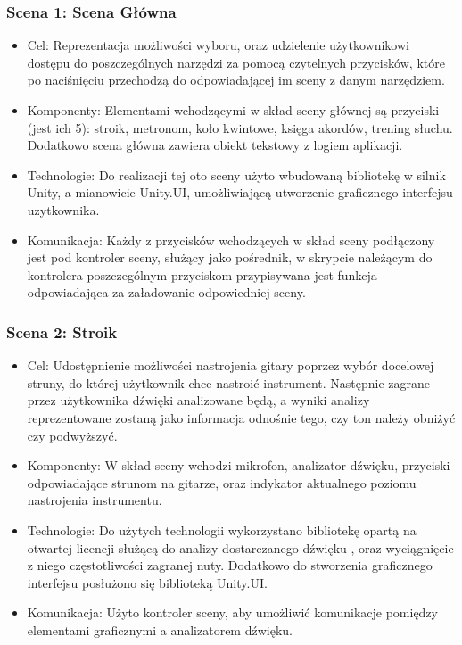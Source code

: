 \subsubsection{Scena 1: Scena Główna}

\begin{itemize}

\item Cel: Reprezentacja możliwości wyboru, oraz udzielenie użytkownikowi dostępu do poszczególnych narzędzi za pomocą czytelnych przycisków, które po naciśnięciu przechodzą do odpowiadającej im sceny z danym narzędziem. 
\item Komponenty: Elementami wchodzącymi w skład sceny głównej są przyciski (jest ich 5): stroik, metronom, koło kwintowe, księga akordów, trening słuchu. Dodatkowo scena główna zawiera obiekt tekstowy z logiem aplikacji.  
\item Technologie: Do realizacji tej oto sceny użyto wbudowaną bibliotekę w silnik Unity, a mianowicie Unity.UI, umożliwiającą utworzenie graficznego interfejsu uzytkownika. 
\item Komunikacja: Każdy z przycisków wchodzących w skład sceny podłączony jest pod kontroler sceny, służący jako pośrednik, w skrypcie należącym do kontrolera poszczególnym przyciskom przypisywana jest funkcja odpowiadająca za załadowanie odpowiedniej sceny. 
\end{itemize}

\subsubsection{Scena 2: Stroik}

\begin{itemize}
\item Cel: Udostępnienie możliwości nastrojenia gitary poprzez wybór docelowej struny, do której użytkownik chce nastroić instrument. Następnie zagrane przez użytkownika dźwięki analizowane będą, a wyniki analizy reprezentowane zostaną jako informacja odnośnie tego, czy ton należy obniżyć czy podwyższyć.
\item Komponenty: W skład sceny wchodzi mikrofon, analizator dźwięku, przyciski odpowiadające strunom na gitarze, oraz indykator aktualnego poziomu nastrojenia instrumentu.  
\item Technologie: Do użytych technologii wykorzystano bibliotekę opartą na otwartej licencji służącą do analizy dostarczanego dźwięku \cite{AudioPitchEstimator}, oraz wyciągnięcie z niego częstotliwości zagranej nuty. Dodatkowo do stworzenia graficznego interfejsu posłużono się biblioteką Unity.UI.   
\item Komunikacja: Użyto kontroler sceny, aby umożliwić komunikacje pomiędzy elementami graficznymi a analizatorem dźwięku. 
\end{itemize}

